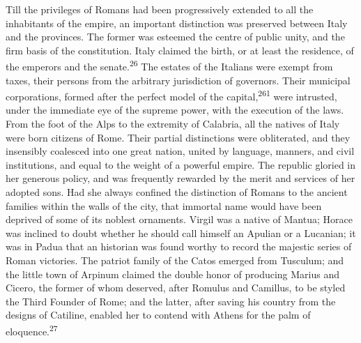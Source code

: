 Till the privileges of Romans had been progressively extended to
all the inhabitants of the empire, an important distinction was
preserved between Italy and the provinces. The former was
esteemed the centre of public unity, and the firm basis of the
constitution. Italy claimed the birth, or at least the residence,
of the emperors and the senate.\textsuperscript{26} The estates of the Italians
were exempt from taxes, their persons from the arbitrary
jurisdiction of governors. Their municipal corporations, formed
after the perfect model of the capital,\textsuperscript{261} were intrusted, under
the immediate eye of the supreme power, with the execution of the
laws. From the foot of the Alps to the extremity of Calabria, all
the natives of Italy were born citizens of Rome. Their partial
distinctions were obliterated, and they insensibly coalesced into
one great nation, united by language, manners, and civil
institutions, and equal to the weight of a powerful empire. The
republic gloried in her generous policy, and was frequently
rewarded by the merit and services of her adopted sons. Had she
always confined the distinction of Romans to the ancient families
within the walls of the city, that immortal name would have been
deprived of some of its noblest ornaments. Virgil was a native of
Mantua; Horace was inclined to doubt whether he should call
himself an Apulian or a Lucanian; it was in Padua that an
historian was found worthy to record the majestic series of Roman
victories. The patriot family of the Catos emerged from Tusculum;
and the little town of Arpinum claimed the double honor of
producing Marius and Cicero, the former of whom deserved, after
Romulus and Camillus, to be styled the Third Founder of Rome; and
the latter, after saving his country from the designs of
Catiline, enabled her to contend with Athens for the palm of
eloquence.\textsuperscript{27}




